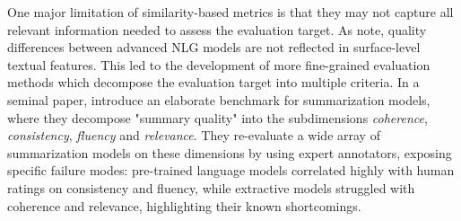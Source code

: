 
One major limitation of similarity-based metrics is that they may not capture all relevant information needed to assess the evaluation target. As \citet{gehrmannRepairingCrackedFoundation2022} note, quality differences between advanced NLG models are not reflected in surface-level textual features. This led to the development of more fine-grained evaluation methods which decompose the evaluation target into multiple criteria. In a seminal paper, \citet{fabbri_summeval_2021} introduce an elaborate benchmark for summarization models, where they decompose "summary quality" into the subdimensions \textit{coherence}, \textit{consistency}, \textit{fluency} and \textit{relevance}. They re-evaluate a wide array of summarization models on these dimensions by using expert annotators, exposing specific failure modes: pre-trained language models correlated highly with human ratings on consistency and fluency, while extractive models struggled with coherence and relevance, highlighting their known shortcomings. 





